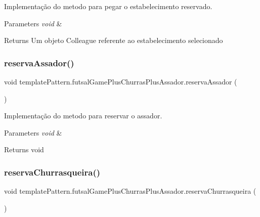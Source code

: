 Implementação do metodo para pegar o estabelecimento reservado. 


\begin{DoxyParams}{Parameters}
{\em void} & \\
\hline
\end{DoxyParams}
\begin{DoxyReturn}{Returns}
Um objeto Colleague referente ao estabelecimento selecionado 
\end{DoxyReturn}
\mbox{\label{classtemplate_pattern_1_1futsal_game_plus_churras_plus_assador_a667038b9859e61e8549d166c9d694620}} 
\subsubsection{\texorpdfstring{reservaAssador()}{reservaAssador()}}
{\footnotesize\ttfamily void template\+Pattern.\+futsal\+Game\+Plus\+Churras\+Plus\+Assador.\+reserva\+Assador (\begin{DoxyParamCaption}{ }\end{DoxyParamCaption})}



Implementação do metodo para reservar o assador. 


\begin{DoxyParams}{Parameters}
{\em void} & \\
\hline
\end{DoxyParams}
\begin{DoxyReturn}{Returns}
void 
\end{DoxyReturn}
\mbox{\label{classtemplate_pattern_1_1futsal_game_plus_churras_plus_assador_aee770d4b06586fc0ae75d4670854fc64}} 
\subsubsection{\texorpdfstring{reservaChurrasqueira()}{reservaChurrasqueira()}}
{\footnotesize\ttfamily void template\+Pattern.\+futsal\+Game\+Plus\+Churras\+Plus\+Assador.\+reserva\+Churrasqueira (\begin{DoxyParamCaption}{ }\end{DoxyParamCaption})}



